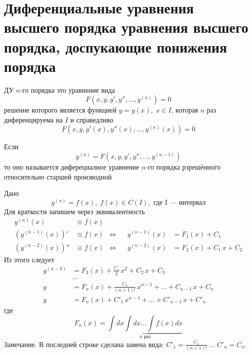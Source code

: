 \author{Tkachuk Andrei}

\section{Диференциальные уравнения высшего порядка уравнения высшего порядка, доспукающие понижения порядка}

\begin{Def}
    ДУ $n$-го порядка это уравнение вида 
    \[
        F(x, y, y', y'', \dots, y^{(n)}) = 0
    \]
    решение которого является функцией $y = y(x), \; x \in I$, которая $n$ раз диференцируема на $I$ и справедливо
    \[
        F(x, y, y'(x), y''(x), \dots, y^{(n)}(x)) = 0
    \]
\end{Def}

\begin{Def}
    Если 
    \[
        y^{(n)} = F(x, y, y', y'', \dots, y^{(n - 1)})
    \] 
    то оно называется диферециалное уравнение $n$-го порядка рзрешённого относительно старшей производной
\end{Def}

\begin{Example}
    Дано
    \[
        y^{(n)} = f(x), \; f(x) \in C(I), \text{ где I --- интервал}
    \]
    Для краткости запишем через эквивалентность
    \begin{align*}
        y^{(n)}(x) &\equiv f(x)\\
        (y^{(n-1)}(x))' & \equiv f(x) &\Leftrightarrow& &y^{(n-1)}(x) &= F_1(x) + C_1\\
        (y^{(n-2)}(x))'' & \equiv f(x) &\Leftrightarrow& &y^{(n-2)}(x) &= F_2(x) + C_1 \, x + C_2
    \end{align*}
    Из этого следует
    \begin{align*} 
        y^{(n-3)} &= F_3(x) + \frac{C_1}{2} \, x^2 + C_2 \, x + C_3\\
        &\dots\\
        y &= F_n(x) + \frac{C_1}{(n+1)!}\,x^{n - 1} + \dots + C_{n - 1}\,x + C_n\\
        y &= F_n(x) + C'_1 \, x^{n - 1} + \dots + C'_{n - 1}\,x + C'_n
    \end{align*}
    где
    \[
        F_n(x) = \underbrace{\int dx \int dx \dots \int f(x)dx}_{n \text{ раз}}
    \]
    Замечание. В последней строке сделана замена вида: $C'_1 = \frac{C_1}{(n+1)!} \; \dots \; C'_n = C_n$.\\
\end{Example}

